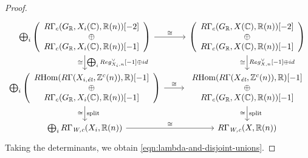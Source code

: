\documentclass{article}
\numberwithin{equation}{section}
\begin{document}
\begin{lemma}
\begin{proof}
    \[ \begin{tikzcd}
        \bigoplus_i \left(\begin{array}{c} R\Gamma_c (G_\RR, X_i (\CC), \RR (n)) [-2] \\ \oplus \\ R\Gamma_c (G_\RR, X_i (\CC), \RR (n)) [-1] \end{array}\right) \ar{d}{\bigoplus_i Reg_{X_i,n}^\vee [-1] \oplus id}[swap]{\cong} \ar{r}{\cong} & \left(\begin{array}{c} R\Gamma_c (G_\RR, X (\CC), \RR (n)) [-2] \\ \oplus \\ R\Gamma_c (G_\RR, X (\CC), \RR (n)) [-1] \end{array}\right) \ar{d}{Reg_{X,n}^\vee [-1] \oplus id}[swap]{\cong} \\
        \bigoplus_i \left(\begin{array}{c} \RHom (R\Gamma (X_{i,\et}, \ZZ^c (n)), \RR) [-1] \\ \oplus \\ R\Gamma_c (G_\RR, X_i (\CC), \RR (n)) [-1] \end{array}\right) \ar{d}{\text{split}}[swap]{\cong} \ar{r}{\cong} & \begin{array}{c} \RHom (R\Gamma (X_\et, \ZZ^c (n)), \RR) [-1] \\ \oplus \\ R\Gamma_c (G_\RR, X (\CC), \RR (n)) [-1] \end{array} \ar{d}{\text{split}}[swap]{\cong} \\
        \bigoplus_i R\Gamma_\Wc (X_i, \RR (n)) \ar{r}{\cong} & R\Gamma_\Wc (X, \RR (n))
      \end{tikzcd} \]
    Taking the determinants, we obtain \eqref{eqn:lambda-and-disjoint-unions}.
  \end{proof}
\end{lemma}
\end{document}
